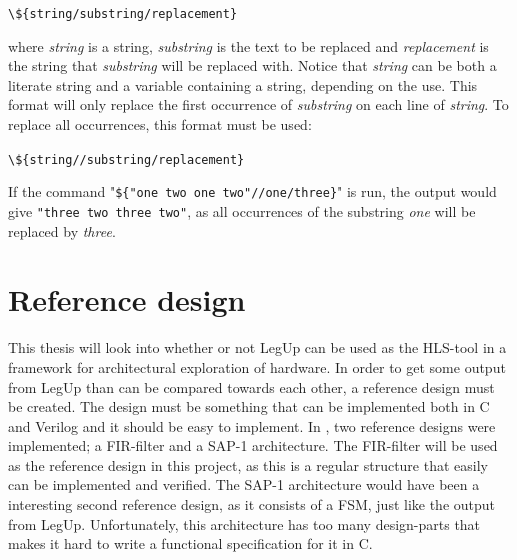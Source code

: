 \verb!\${string/substring/replacement}!

where \textit{string} is a string, \textit{substring} is the text to be replaced and \textit{replacement} is the string that \textit{substring} will be replaced with. Notice that \textit{string} can be both a literate string and a variable containing a string, depending on the use. This format will only replace the first occurrence of \textit{substring} on each line of \textit{string}. To replace all occurrences, this format must be used:

\verb!\${string//substring/replacement}!

If the command "\verb!${"one two one two"//one/three}!" is run, the output would give \verb!"three two three two"!, as all occurrences of the substring \textit{one} will be replaced by \textit{three}.

\section{Reference design}
\label{sec:refdes}
This thesis will look into whether or not LegUp can be used as the HLS-tool in a framework for architectural exploration of hardware. In order to get some output from LegUp than can be compared towards each other, a reference design must be created. The design must be something that can be implemented both in C and Verilog and it should be easy to implement. In \cite{holm2015pro}, two reference designs were implemented; a FIR-filter and a SAP-1 architecture. The FIR-filter will be used as the reference design in this project, as this is a regular structure that easily can be implemented and verified. The SAP-1 architecture would have been a interesting second reference design, as it consists of a FSM, just like the output from LegUp. Unfortunately, this architecture has too many design-parts that makes it hard to write a functional specification for it in C.


